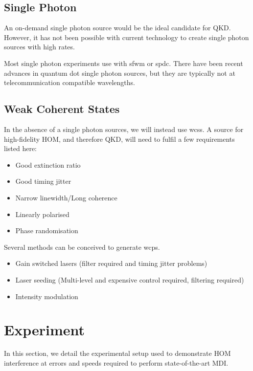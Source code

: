 \subsection{Single Photon}

An on-demand single photon source would be the ideal candidate for \ac{QKD}. However, it has not been possible with current technology to create single photon sources with high rates.

Most single photon experiments use with \ac{sfwm} or \ac{spdc}. There have been recent advances in quantum dot single photon sources, but they are typically not at telecommunication compatible wavelengths.

\subsection{Weak Coherent States}

In the absence of a single photon sources, we will instead use \acp{wcs}. A source for high-fidelity \ac{HOM}, and therefore \ac{QKD}, will need to fulfil a few requirements listed here:

\begin{itemize}
	\item Good extinction ratio
	\item Good timing jitter
	\item Narrow linewidth/Long coherence
	\item Linearly polarised
	\item Phase randomisation
\end{itemize}

Several methods can be conceived to generate \acp{wcp}.

\begin{itemize}
	\item Gain switched lasers (filter required and timing jitter problems)
	\item Laser seeding	(Multi-level and expensive control required, filtering required)
	\item Intensity modulation
\end{itemize}

\section{Experiment}

In this section, we detail the experimental setup used to demonstrate \ac{HOM} interference at errors and speeds required to perform state-of-the-art \ac{MDI}.

